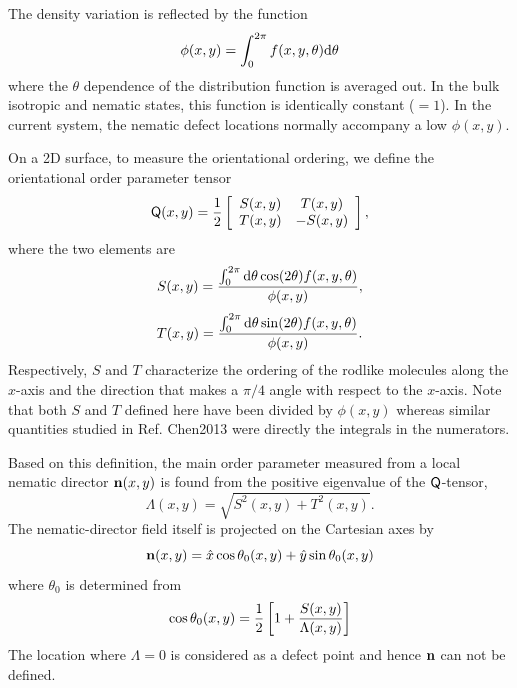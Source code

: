 \documentclass[pre,twocolumn,preprintnumbers,reprint]{revtex4}
\newcommand{\rd}{{\rm d}}
\newcommand{\be}{\begin{equation}}
\newcommand{\en}{\end{equation}}
\newcommand*{\citen}{}%
\DeclareRobustCommand*{\citen}[1]{%
  \begingroup
    \romannumeral-`\x %
    \setcitestyle{numbers}%
    \cite{#1}%
  \endgroup
}
\begin{document}
The density variation is reflected by the function
\begin{equation}\label{1}
\phi(x,y)=\int_0^{2\pi}f(x,y,\theta) \rd\theta
\end{equation}
where the $\theta$ dependence of the distribution function is averaged out. In the bulk isotropic and nematic states, this function is identically constant ($=1$). In the current system, the nematic defect locations normally accompany a low $\phi(x,y)$.

On a 2D surface, to measure the orientational ordering, we define the orientational order parameter tensor
\begin{equation}  \label{Qdef}
  \begin{split}
    {\sf Q}(x,y) &= {1\over 2} \left[\begin{array}{cc}
      S(x,y) & T(x,y)\\
      T(x,y) & -S(x,y)
    \end{array}\right],\\
  \end{split}
\end{equation}
where the two elements are
\be
S(x,y)=\frac{\int_0^{2\pi}\rd\theta\cos(2\theta)f(x,y,\theta)}{\phi(x,y)},
\en
\be
T(x,y)=\frac{\int_0^{2\pi}\rd\theta\sin(2\theta)f(x,y,\theta)}{\phi(x,y)}.
\en
Respectively, $S$ and $T$ characterize the ordering of the rodlike molecules along the $x$-axis and the direction that makes a $\pi/4$ angle with respect to the $x$-axis. Note that both $S$ and $T$ defined here have been divided by $\phi(x,y)$ whereas similar quantities studied in Ref. \citen{Chen2013} were directly the integrals in the numerators.

Based on this definition, the main order parameter measured from a local nematic director ${\bf n}(x,y)$ is found from the positive eigenvalue of the $\sf Q$-tensor,
\begin{equation}\label{lambda}
\Lambda (x,y) = \sqrt{S^2(x,y)+T^2(x,y)}.
\end{equation}
The nematic-director field itself is projected on the Cartesian axes by
\begin{equation}\label{ndef}
{\bf n}(x,y) = {\hat x}\cos\theta_0(x,y) + {\hat y}\sin\theta_0(x,y)
\end{equation}
where $\theta_0$ is determined from
\begin{equation}\label{thetadef}
\cos\theta_0 (x,y) = {1\over 2}\left[1 + {S(x,y)\over\Lambda(x,y)}\right]
\end{equation}
The location where $\Lambda =0$ is considered as a defect point and hence $\bf n$ can not be defined.
\end{document}
